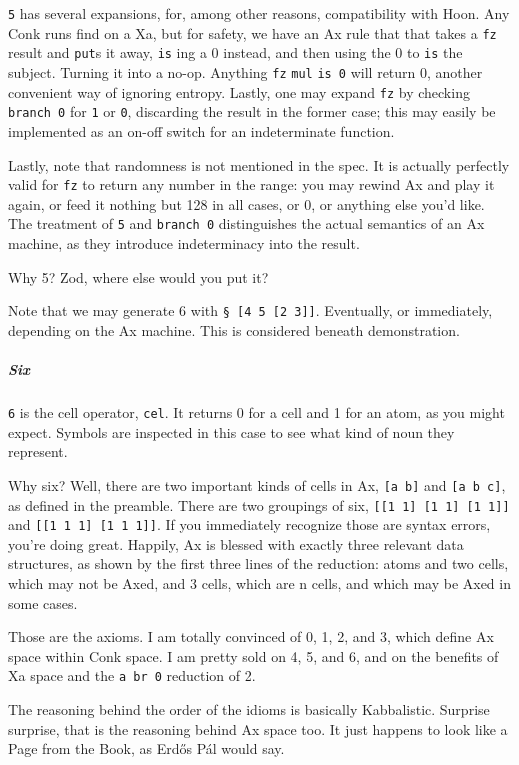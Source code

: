 \documentclass[twoside]{article}
\begin{document}
\texttt{5} has several expansions, for, among other reasons, compatibility with Hoon. Any Conk runs find on a Xa, but for safety, we have an Ax rule that that takes a \texttt{fz} result and \texttt{put}s it away, \texttt{is} ing a 0 instead, and then using the 0 to \texttt{is} the subject. Turning it into a no-op. Anything \texttt{fz} \texttt{mul} \texttt{is 0} will return 0, another convenient way of ignoring entropy. Lastly, one may expand \texttt{fz} by checking \texttt{branch 0} for \texttt{1} or \texttt{0}, discarding the result in the former case; this may easily be implemented as an on-off switch for an indeterminate function.

Lastly, note that randomness is not mentioned in the spec. It is actually perfectly valid for \texttt{fz} to return any number in the range: you may rewind Ax and play it again, or feed it nothing but 128 in all cases, or 0, or anything else you'd like. The treatment of \texttt{5} and \texttt{branch 0} distinguishes the actual semantics of an Ax machine, as they introduce indeterminacy into the result. 

Why 5? Zod, where else would you put it? 

Note that we may generate 6 with \texttt{§ [4 5 [2 3]]}. Eventually, or immediately, depending on the Ax machine. This is considered beneath demonstration.

\subparagraph{Six}

\texttt{6} is the cell operator, \texttt{cel}. It returns 0 for a cell and 1 for an atom, as you might expect. Symbols are inspected in this case to see what kind of noun they represent. 

Why six? Well, there are two important kinds of cells in Ax, \texttt{[a b]} and \texttt{[a b c]}, as defined in the preamble. There are two groupings of six, \texttt{[[1 1] [1 1] [1 1]]} and \texttt{[[1 1 1] [1 1 1]]}. If you immediately recognize those are syntax errors, you're doing great. Happily, Ax is blessed with exactly three relevant data structures, as shown by the first three lines of the reduction: atoms and two cells, which may not be Axed, and 3 cells, which are n cells, and which may be Axed in some cases. 

Those are the axioms. I am totally convinced of 0, 1, 2, and 3, which define Ax space within Conk space. I am pretty sold on 4, 5, and 6, and on the benefits of Xa space and the \texttt{a br 0} reduction of 2. 

The reasoning behind the order of the idioms is basically Kabbalistic. Surprise surprise, that is the reasoning behind Ax space too. It just happens to look like a Page from the Book, as Erdős Pál would say.
\end{document}
